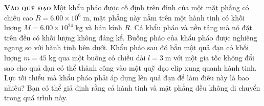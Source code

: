 \begin{problem}{\textbf{\textsc{Vào quỹ đạo}}} Một khẩu pháo được cố định trên đỉnh của một mặt phẳng có chiều cao $R = 6.00 \times 10^6\;\mathrm{m}$, mặt phẳng này nằm trên một hành tinh có khối lượng $M = 6.00 \times 10^{24}\;\mathrm{kg}$ và bán kính $R$. Cả khẩu pháo và nền tảng mà nó đặt trên đều có khối lượng không đáng kể. Buồng pháo của khẩu pháo được nghiêng ngang so với hành tinh bên dưới. Khẩu pháo sau đó bắn một quả đạn có khối lượng $m = 45\;\mathrm{kg}$ qua một buồng có chiều dài $l=3\;\mathrm{m}$ với một gia tốc không đổi sao cho quả đạn có thể thành công vào một quỹ đạo elip xung quanh hành tinh. Lực tối thiểu mà khẩu pháo phải áp dụng lên quả đạn để làm điều này là bao nhiêu? Bạn có thể giả định rằng cả hành tinh và mặt phẳng đều không di chuyển trong quá trình này.\end{problem}
